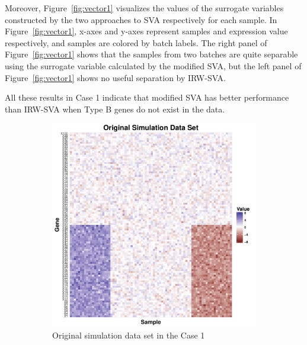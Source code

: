 \documentclass[11pt]{article}
\begin{document}
Moreover, Figure~\ref{fig:vector1} visualizes the values of the surrogate variables constructed by the two approaches to SVA respectively for each sample. In Figure~\ref{fig:vector1}, x-axes and y-axes represent samples and expression value respectively, and samples are colored by batch labels. The right panel of Figure~\ref{fig:vector1} shows that the samples from two batches are quite separable using the surrogate variable calculated by the modified SVA, but the left panel of Figure~\ref{fig:vector1} shows no useful separation by IRW-SVA. 

All these results in Case 1 indicate that modified SVA has better performance than IRW-SVA when Type B genes do not exist in the data.

\begin{figure}[h!]
    \centering
    \begin{subfigure}[b]{0.31\textwidth}
        \centering
        \includegraphics[width = \textwidth]{figures/simulate1.pdf}
        \caption{Original simulation data set in the Case 1}
        \label{fig:data1}
    \end{subfigure}%
~
    \begin{subfigure}[b]{0.31\textwidth}
        \centering

\end{subfigure}
\end{figure}
\end{document}
